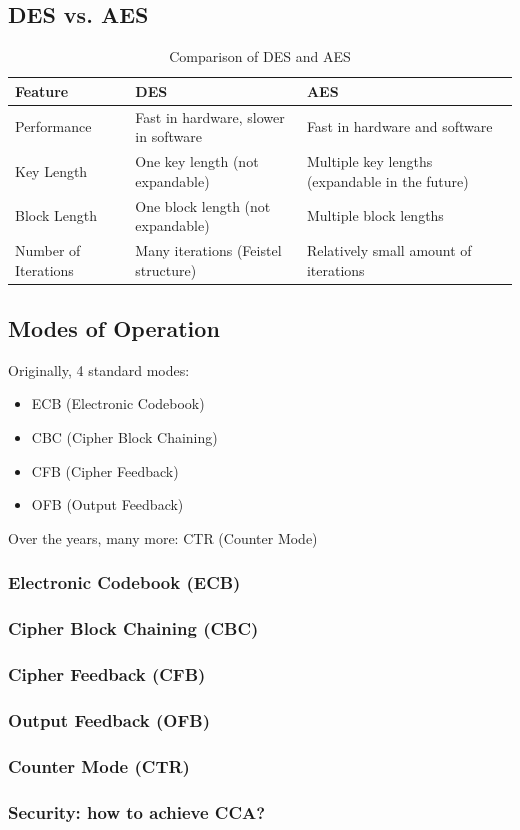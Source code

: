\subsection{DES vs. AES}
\begin{table}[h!]
    \centering
    \begin{tabular}{|>{\raggedright\arraybackslash}m{4cm}|>{\raggedright\arraybackslash}m{6cm}|>{\raggedright\arraybackslash}m{6cm}|}
    \hline
    \textbf{Feature} & \textbf{DES} & \textbf{AES} \\
    \hline
    Performance & Fast in hardware, slower in software & Fast in hardware and software \\
    \hline
    Key Length & One key length (not expandable) & Multiple key lengths (expandable in the future) \\
    \hline
    Block Length & One block length (not expandable) & Multiple block lengths \\
    \hline
    Number of Iterations & Many iterations (Feistel structure) & Relatively small amount of iterations \\
    \hline
    \end{tabular}
    \caption{Comparison of DES and AES}
\end{table}



\subsection{Modes of Operation}
Originally, 4 standard modes:
\begin{itemize}
    \item ECB (Electronic Codebook)
    \item CBC (Cipher Block Chaining)
    \item CFB (Cipher Feedback)
    \item OFB (Output Feedback)
\end{itemize}

Over the years, many more: CTR (Counter Mode)

\subsubsection{Electronic Codebook (ECB)}

\subsubsection{Cipher Block Chaining (CBC)}

\subsubsection{Cipher Feedback (CFB)}

\subsubsection{Output Feedback (OFB)}

\subsubsection{Counter Mode (CTR)}

\subsubsection{Security: how to achieve CCA?}